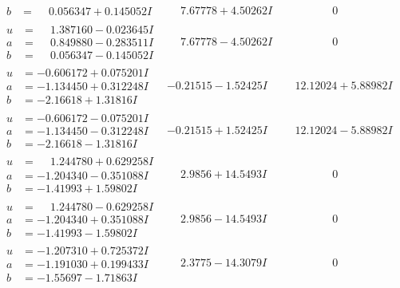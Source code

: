 \documentclass[1p]{elsarticle_modified}
\theoremstyle{definition}
\begin{document}
$$\begin{array}{c|c|c}
\begin{aligned}
b &= \phantom{-}0.056347 + 0.145052 I\end{aligned}
 & \phantom{-}7.67778 + 4.50262 I & \phantom{-0.000000 } 0 \\ \hline\begin{aligned}
u &= \phantom{-}1.387160 - 0.023645 I \\
a &= \phantom{-}0.849880 - 0.283511 I \\
b &= \phantom{-}0.056347 - 0.145052 I\end{aligned}
 & \phantom{-}7.67778 - 4.50262 I & \phantom{-0.000000 } 0 \\ \hline\begin{aligned}
u &= -0.606172 + 0.075201 I \\
a &= -1.134450 + 0.312248 I \\
b &= -2.16618 + 1.31816 I\end{aligned}
 & -0.21515 - 1.52425 I & \phantom{-}12.12024 + 5.88982 I \\ \hline\begin{aligned}
u &= -0.606172 - 0.075201 I \\
a &= -1.134450 - 0.312248 I \\
b &= -2.16618 - 1.31816 I\end{aligned}
 & -0.21515 + 1.52425 I & \phantom{-}12.12024 - 5.88982 I \\ \hline\begin{aligned}
u &= \phantom{-}1.244780 + 0.629258 I \\
a &= -1.204340 - 0.351088 I \\
b &= -1.41993 + 1.59802 I\end{aligned}
 & \phantom{-}2.9856 + 14.5493 I & \phantom{-0.000000 } 0 \\ \hline\begin{aligned}
u &= \phantom{-}1.244780 - 0.629258 I \\
a &= -1.204340 + 0.351088 I \\
b &= -1.41993 - 1.59802 I\end{aligned}
 & \phantom{-}2.9856 - 14.5493 I & \phantom{-0.000000 } 0 \\ \hline\begin{aligned}
u &= -1.207310 + 0.725372 I \\
a &= -1.191030 + 0.199433 I \\
b &= -1.55697 - 1.71863 I\end{aligned}
 & \phantom{-}2.3775 - 14.3079 I & \phantom{-0.000000 } 0 \\ \hline\begin{aligned}

\end{aligned}
\end{array}$$
\end{document}
